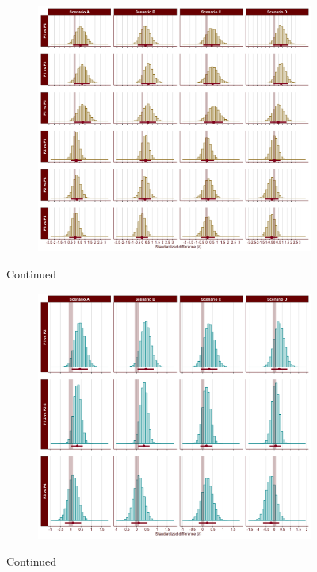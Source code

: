 \documentclass[
  english,
  man]{apa6}
\begin{document}
\begin{appendix}
\begin{figure}[ht]\ContinuedFloat
\centering
\begin{subfigure}{1\textwidth}
\includegraphics[width=\linewidth]{Figures/SC2_first_scenario_comparisons_B.png}
\label{fig:first-scenario-comparisons-B}
\end{subfigure}
\caption[]{Continued}
\end{figure}

\medskip

\begin{figure}[ht]\ContinuedFloat
\centering
\begin{subfigure}{1\textwidth}
\includegraphics[width=\linewidth]{Figures/SC2_first_scenario_comparisons_C.png}
\label{fig:first-scenario-comparisons-C}
\end{subfigure}
\caption[]{Continued}
\label{fig:first-scenario-comparisons}
\end{figure}


\end{appendix}
\end{document}

